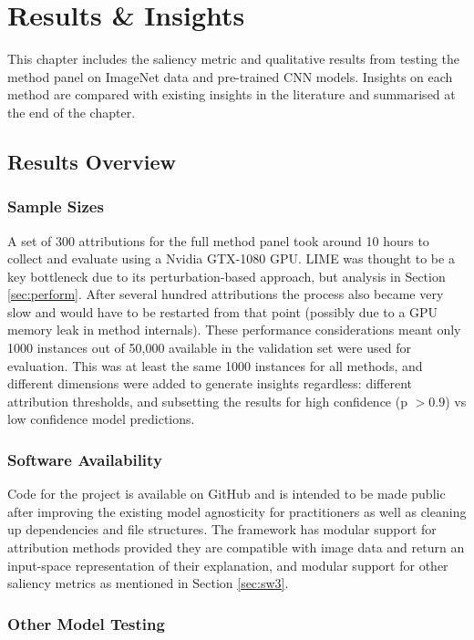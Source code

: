 \documentclass[main]{subfiles}
\begin{document}
\chapter{Results \& Insights}


This chapter includes the saliency metric and qualitative results from testing the method panel on ImageNet data and pre-trained CNN models. Insights on each method are compared with existing insights in the literature and summarised at the end of the chapter.

\section{Results Overview}

\subsection{Sample Sizes}  \label{sec:data_collection}
A set of 300 attributions for the full method panel took around 10 hours to collect and evaluate using a Nvidia GTX-1080 GPU. LIME was thought to be a key bottleneck due to its perturbation-based approach, but analysis in Section \ref{sec:perform}. After several hundred attributions the process also became very slow and would have to be restarted from that point (possibly due to a GPU memory leak in method internals). These performance considerations meant only 1000 instances out of 50,000 available in the validation set were used for evaluation. This was at least the same 1000 instances for all methods, and different dimensions were added to generate insights regardless: different attribution thresholds, and subsetting the results for high confidence (p $>0.9$) vs low confidence model predictions.

\subsection{Software Availability}

Code for the project is available on GitHub and is intended to be made public after improving the existing model agnosticity for practitioners as well as cleaning up dependencies and file structures. The framework has modular support for attribution methods provided they are compatible with image data and return an input-space representation of their explanation, and modular support for other saliency metrics as mentioned in Section \ref{sec:sw3}.


\subsection{Other Model Testing} \label{sec:shap_note}
\end{document}
